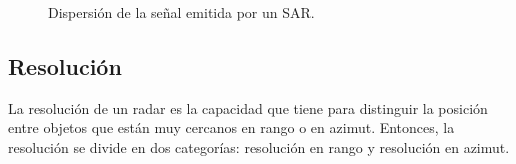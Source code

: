 \begin{figure}[H]
	\centering    
	\caption{\label{SeñalDispersada}Dispersión de la señal emitida por un SAR.}
\end{figure} 
%
\subsection{Resolución}

La resolución de un radar es la capacidad que tiene para distinguir la posición entre objetos que están muy cercanos en rango o en azimut. Entonces, la resolución se divide en dos categorías: resolución en rango y resolución en azimut. 

